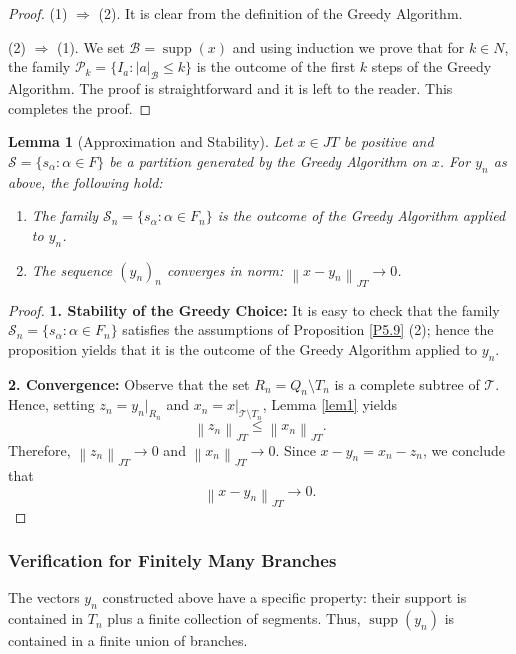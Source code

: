 \documentclass[11pt,a4paper]{amsart}
\newtheorem{lemma}[theorem]{Lemma}
\newcommand{\JT}{JT}
\newcommand{\Tree}{\mathcal{T}}
\newcommand{\norm}[1]{\left\lVert#1\right\rVert}
\newcommand{\supp}{\operatorname{supp}}
\newcommand{\N}{N}
\begin{document}
\begin{proof} (1) $\Rightarrow$ (2). It is clear from the definition of the Greedy Algorithm.

(2) $\Rightarrow$ (1). We set $\mathcal{B} = \supp(x)$ and using induction we prove that for $k\in \N$,
the family $ \mathcal{P}_k = \{ I_a : |a|_\mathcal{B} \le k\}$ is the outcome of the first $k$ steps of the Greedy Algorithm.
The proof is straightforward and it is left to the reader. This completes the proof.
\end{proof}
\begin{lemma}[Approximation and Stability] \label{lemma5.6}
    Let $x \in \JT$ be positive and $\mathcal{S} = \{ s_{\alpha} : \alpha \in F \} $ be a partition generated by the Greedy Algorithm on $x$. For $y_n$ as above, the following hold:
    \begin{enumerate}
        \item The family $\mathcal{S}_n = \{ s_\alpha : \alpha \in F_n \} $ is the outcome of the Greedy Algorithm applied to $y_n$.
        \item The sequence $(y_n)_n$ converges in norm: $\norm{x - y_n}_{\JT} \to 0$.
    \end{enumerate}
\end{lemma}

\begin{proof}
    \textbf{1. Stability of the Greedy Choice:}
    It is easy to check that the family $\mathcal{S}_n = \{ s_\alpha : \alpha \in F_n \} $ satisfies the assumptions of Proposition \ref{P5.9} (2); hence the proposition yields that it is the outcome of the Greedy Algorithm applied to $y_n$.
    
    \textbf{2. Convergence:}
    Observe that the set $R_n = Q_n \setminus T_n$ is a complete subtree of $\Tree$. Hence, setting 
    $z_n = y_n|_{R_n}$ and $x_n = x|_{\Tree \setminus T_n}$, Lemma \ref{lem1} yields 
    \[ \norm{z_n}_{\JT} \le \norm{x_n}_{\JT}. \]
    Therefore, $\norm{z_n}_{\JT} \to 0$ and $\norm{x_n}_{\JT} \to 0$.
    Since $x - y_n = x_n - z_n$, we conclude that \[\norm{x - y_n}_{\JT} \to 0. \]
\end{proof}

\subsubsection{Verification for Finitely Many Branches}\label{lemma5.7}

The vectors $y_n$ constructed above have a specific property: their support is contained in $T_n$ plus a finite collection of segments. Thus, $\supp(y_n)$ is contained in a finite union of branches.
\end{document}
